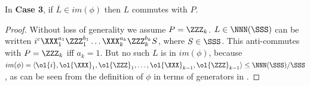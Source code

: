 \begin{lemma}\label{lem:if_in_im_phi_then_commutes_with_P}
    In \textbf{Case 3}, if $\overline{L} \in im(\phi)$ then $L$ commutes with $P$.
    \begin{proof}
        Without loss of generality we assume $P = \ZZZ_k$.
        $L \in \NNN(\SSS)$ can be written $i^c \XXX_1^{a_1} \ZZZ_1^{b_1} \ldots \XXX_k^{a_k} \ZZZ_k^{b_k} S$, where $S \in \SSS$.
        This anti-commutes with $P = \ZZZ_k$ iff $a_k = 1$.
        But no such $L$ is in $im(\phi)$, because $im(\phi) = \langle \ol{i}, \ol{\XXX}_1, \ol{\ZZZ}_1, \ldots, \ol{\XXX}_{k-1}, \ol{\ZZZ}_{k-1} \rangle \leq \NNN(\SSS)/\SSS$, as can be seen from the definition of $\phi$ in terms of generators in .
    \end{proof}
\end{lemma}

